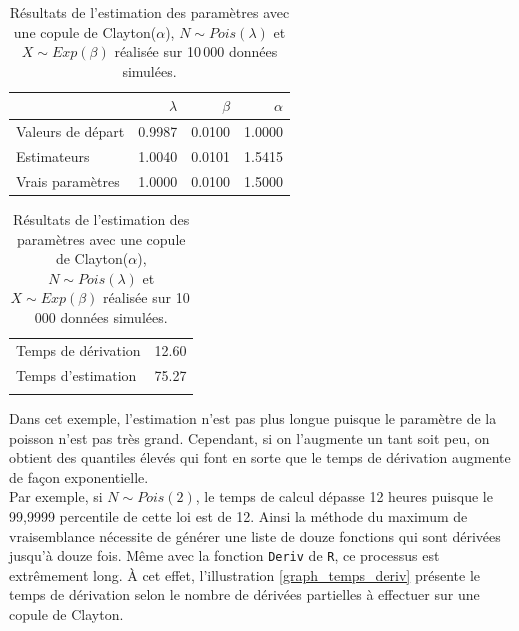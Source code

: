 \documentclass{article}
\begin{document}
		\begin{table}[H]
			\centering
			\begin{tabular}{lrrr}
				\hline
				& $\lambda$ & $\beta$ & $\alpha$ \\ 
				\hline
				Valeurs de départ & 0.9987 & 0.0100 & 1.0000 \\ 
				Estimateurs & 1.0040 & 0.0101 & 1.5415 \\ 
				Vrais paramètres & 1.0000 & 0.0100 & 1.5000 \\
				\hline
			\end{tabular}
		\begin{tabular}{lr}
			\hline
			&  \\ 
			\hline
			Temps de dérivation & 12.60 \\ 
			Temps d'estimation & 75.27 \\ 
			\\
			\hline
		\end{tabular}
			\caption[Résultats du scénario \ref{scenario_Clayton_Pois}]{Résultats de l'estimation des paramètres avec une copule de Clayton($\alpha$), $N\sim Pois(\lambda)$ et $X \sim Exp(\beta)$ réalisée sur 10\,000 données simulées.}\label{tbl_Clayton_Poisson}
		\end{table}
	
		Dans cet exemple, l'estimation n'est pas plus longue puisque le paramètre de la poisson n'est pas très grand. Cependant, si on l'augmente un tant soit peu, on obtient des quantiles élevés qui font en sorte que le temps de dérivation augmente de façon exponentielle.\\
	
		Par exemple, si $N \sim Pois(2)$, le temps de calcul dépasse 12 heures puisque le 99,9999 percentile de cette loi est de 12. Ainsi la méthode du maximum de vraisemblance nécessite de générer une liste de douze fonctions qui sont dérivées jusqu'à douze fois. Même avec la fonction \texttt{Deriv} de \texttt{R}, ce processus est extrêmement long. À cet effet, l'illustration \ref{graph_temps_deriv} présente le temps de dérivation selon le nombre de dérivées partielles à effectuer sur une copule de Clayton.
		
\end{document}
